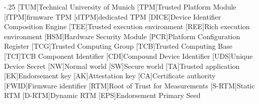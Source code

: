 \documentclass[headsepline,footsepline,footinclude=false,fontsize=11pt,paper=a4,listof=totoc,bibliography=totoc,BCOR=12mm,DIV=12]{scrbook} %
\begin{document}


\frontmatter{}





\tableofcontents{}

\mainmatter{}

%








\appendix{}


\begin{acronym}
	\itemsep-.25\baselineskip
	[TUM]{Technical University of Munich}
	[TPM]{Trusted Platform Module}
	[fTPM]{firmware TPM}
	[dTPM]{dedicated TPM}
	[DICE]{Device Identifier Composition Engine}
	[TEE]{Trusted execution environment}
	[REE]{Rich execution environment}
	[HSM]{Hardware Security Module}
	[PCR]{Platform Configuration Register}
	[TCG]{Trusted Computing Group}
	[TCB]{Trusted Computing Base}
	[TCI]{TCB Component Identifier}
	[CDI]{Compound Device Identifier}
	[UDS]{Unique Device Secret}
	[NW]{Normal world}
	[SW]{Secure world}
	[TA]{Trusted application}
	[EK]{Endorsement key}
	[AK]{Attestation key}
	[CA]{Certificate authority}
	[FWID]{Firmware identifier}
	[RTM]{Root of Trust for Measurements}
	[S-RTM]{Static \ac{RTM}}
	[D-RTM]{Dynamic \ac{RTM}}
	[EPS]{Endorsement Primary Seed}
\end{acronym}

\listoffigures{}
\listoftables{}
\printbibliography{}
\end{document}
